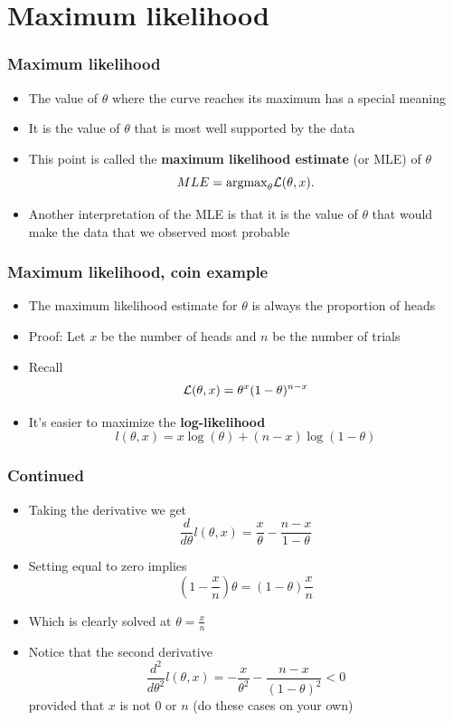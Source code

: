 \documentclass[aspectratio=169]{beamer}
\begin{document}
\section{Maximum likelihood}
\begin{frame}\frametitle{Maximum likelihood}
\begin{itemize}
\item The value of $\theta$ where the curve reaches its maximum has a special meaning
\item It is the value of $\theta$ that is most well supported by the
  data
\item This point is called the {\bf maximum likelihood estimate} (or
  MLE) of $\theta$
  $$
  MLE = \mathrm{argmax}_\theta {\cal L}(\theta, x).
  $$
\item Another interpretation of the MLE is that it is the value of
  $\theta$ that would make the data that we observed most probable
\end{itemize}
\end{frame}

\begin{frame}\frametitle{Maximum likelihood, coin example}
\begin{itemize}
\item The maximum likelihood estimate for $\theta$ is always the proportion of heads
\item Proof: Let $x$ be the number of heads and $n$ be the number of trials
\item Recall 
$$
{\cal L}(\theta, x) = \theta^x(1-\theta)^{n-x}
$$
\item It's easier to maximize the {\bf log-likelihood}
$$
l(\theta, x) = x \log(\theta) + (n - x)\log(1 - \theta)
$$
\end{itemize}
\end{frame}

\begin{frame}\frametitle{Continued}
\begin{itemize}
\item Taking the derivative we get
$$
\frac{d}{d\theta} l(\theta, x) = \frac{x}{\theta} - \frac{n-x}{1 - \theta}
$$
\item Setting equal to zero implies
$$
(1 - \frac{x}{n})\theta = (1 - \theta) \frac{x}{n}
$$
\item Which is clearly solved at $\theta = \frac{x}{n}$
\item Notice that the second derivative
$$
\frac{d^2}{d\theta^2} l(\theta, x) = -\frac{x}{\theta^2} - \frac{n-x}{(1 - \theta)^2} < 0
$$
provided that $x$ is not $0$ or $n$ (do these cases on your own)
\end{itemize}
\end{frame}
\end{document}
